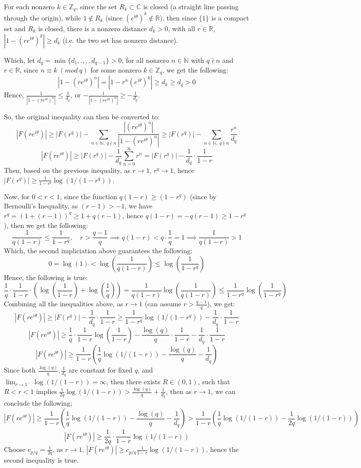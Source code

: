 \documentclass{article}
\begin{document}
For each nonzero $k\in\mathbb{Z}_q$, since the set $R_k\subset\mathbb{C}$ is closed (a straight line passing through the origin), while $1\notin R_k$ (since $(e^{i\theta})^k\notin \mathbb{R}$), 
then since $\{1\}$ is a compact set and $R_k$ is closed, there is a nonzero distance $d_k>0$, with all $r\in\mathbb{R}$, $|1-(re^{i\theta})^k|\geq d_k$ (i.e. the two set has nonzero distance).

Which, let $d_q = \min\{d_1,.,,,d_{q-1}\}>0$, for all nonzero $n\in\mathbb{N}$ with $q\nmid n$ and $r\in\mathbb{R}$, since $n\equiv k\ (mod\ q)$ for some nonzero $k\in\mathbb{Z}_q$, we get the following:
$$|1-(re^{i\theta})^n| = |1-r^n(e^{i\theta})^k| \geq d_k\geq d_q>0$$
Hence, $\frac{1}{|1-(re^{i\theta})^n|}\leq \frac{1}{d_q}$, or $-\frac{1}{|1-(re^{i\theta})^n|}\geq -\frac{1}{d_q}$.

So, the original inequality can then be converted to:
$$|F(re^{i\theta})|\geq |F(r^q)|-\sum_{n\in\mathbb{N},\ q\nmid n}\frac{|(re^{i\theta})^n|}{|1-(re^{i\theta})^n|}\geq |F(r^q)|-\sum_{n\in\mathbb{N},\ q\nmid n}\frac{r^n}{d_q}$$
$$|F(re^{i\theta})|\geq|F(r^q)|-\frac{1}{d_q}\sum_{n=0}^{\infty}r^n=|F(r^q)|-\frac{1}{d_q}\cdot\frac{1}{1-r}$$
Then, based on the previous inequality, as $r\rightarrow 1$, $r^q\rightarrow 1$, hence $|F(r^q)|\geq \frac{1}{1-r^q}\log(1/(1-r^q))$.

Now, for $0<r<1$, since the function $q(1-r)\geq (1-r^q)$ (since by Bernoulli's Inequality, as $(r-1)>-1$, we have $r^q=(1+(r-1))^q\geq 1+q(r-1)$, hence $q(1-r)=-q(r-1)\geq 1-r^q$), then we get the following:
$$\frac{1}{q(1-r)}\leq \frac{1}{1-r^q},\quad r>\frac{q-1}{q}\implies q(1-r)<q\cdot\frac{1}{q}=1\implies \frac{1}{q(1-r)}>1$$
Which, the second impliciation above guarantees the following:
$$0=\log(1)<\log\left(\frac{1}{q(1-r)}\right)\leq \log\left(\frac{1}{1-r^q}\right)$$
Hence, the following is true:
$$\frac{1}{q}\cdot \frac{1}{1-r}\cdot\left(\log\left(\frac{1}{1-r}\right)+\log\left(\frac{1}{q}\right)\right)=\frac{1}{q(1-r)}\log\left(\frac{1}{q(1-r)}\right)\leq \frac{1}{1-r^q}\log\left(\frac{1}{1-r^q}\right)$$
Combining all the inequalities above, as $r\rightarrow 1$ (can assume $r>\frac{q-1}{q}$), we get:
$$|F(re^{i\theta})|\geq |F(r^q)|-\frac{1}{d_q}\cdot\frac{1}{1-r}\geq \frac{1}{1-r^q}\log(1/(1-r^q))-\frac{1}{d_q}\cdot\frac{1}{1-r}$$
$$|F(re^{i\theta})|\geq \frac{1}{q}\cdot\frac{1}{1-r}\log\left(\frac{1}{1-r}\right)-\frac{\log(q)}{q}\cdot\frac{1}{1-r}-\frac{1}{d_q}\cdot\frac{1}{1-r}$$
$$|F(re^{i\theta})|\geq \frac{1}{1-r}\left(\frac{1}{q}\log(1/(1-r))-\frac{\log(q)}{q}-\frac{1}{d_q}\right)$$
Since both $\frac{\log(q)}{q},\frac{1}{d_q}$ are constant for fixed $q$, and $\lim_{r\rightarrow 1^-}\log(1/(1-r))=\infty$, then there exists $R\in (0,1)$, such that $R<r<1$ implies $\frac{1}{2q}\log(1/(1-r))>\frac{\log(q)}{q}+\frac{1}{d_q}$, then as $r\rightarrow 1$, we can conclude the following;
$$|F(re^{i\theta})|\geq \frac{1}{1-r}\left(\frac{1}{q}\log(1/(1-r))-\frac{\log(q)}{q}-\frac{1}{d_q}\right)> \frac{1}{1-r}\left(\frac{1}{q}\log(1/(1-r))-\frac{1}{2q}\log(1/(1-r))\right)$$
$$|F(re^{i\theta})|\geq \frac{1}{2q}\cdot\frac{1}{1-r}\log(1/(1-r))$$
Choose $c_{p/q}=\frac{1}{2q}$, as $r\rightarrow 1$, $|F(re^{i\theta})|\geq c_{p/q}\frac{1}{1-r}\log(1/(1-r))$, hence the second inequality is true.
\end{document}
